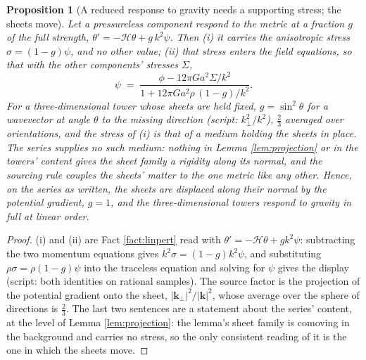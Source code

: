 \documentclass[11pt]{article}
\newtheorem{proposition}[theorem]{Proposition}
\theoremstyle{definition}
\begin{document}
\begin{proposition}[A reduced response to gravity needs a supporting stress; the sheets move]\label{prop:sheetsmove}
Let a pressureless component respond to the metric at a fraction $g$ of the full strength, $\theta' = -\mathcal{H}\theta + g\,k^{2}\psi$. Then (i) it carries the anisotropic stress $\sigma = (1 - g)\psi$, and no other value; (ii) that stress enters the field equations, so that with the other components' stresses $\Sigma$,
\[
\psi \;=\; \frac{\phi - 12\pi G a^{2}\Sigma/k^{2}}{1 + 12\pi G a^{2}\rho\,(1 - g)/k^{2}} .
\]
For a three-dimensional tower whose sheets are held fixed, $g = \sin^{2}\theta$ for a wavevector at angle $\theta$ to the missing direction (script: $k_{\perp}^{2}/k^{2}$), $\tfrac{2}{3}$ averaged over orientations, and the stress of (i) is that of a medium holding the sheets in place. The series supplies no such medium: nothing in Lemma \ref{lem:projection} or in the towers' content gives the sheet family a rigidity along its normal, and the sourcing rule couples the sheets' matter to the one metric like any other. Hence, on the series as written, the sheets are displaced along their normal by the potential gradient, $g = 1$, and the three-dimensional towers respond to gravity in full at linear order.
\end{proposition}

\begin{proof}
(i) and (ii) are Fact \ref{fact:linpert} read with $\theta' = -\mathcal{H}\theta + gk^{2}\psi$: subtracting the two momentum equations gives $k^{2}\sigma = (1 - g)k^{2}\psi$, and substituting $\rho\sigma = \rho(1 - g)\psi$ into the traceless equation and solving for $\psi$ gives the display (script: both identities on rational samples). The source factor is the projection of the potential gradient onto the sheet, $|\mathbf{k}_{\perp}|^{2}/|\mathbf{k}|^{2}$, whose average over the sphere of directions is $\tfrac{2}{3}$. The last two sentences are a statement about the series' content, at the level of Lemma \ref{lem:projection}: the lemma's sheet family is comoving in the background and carries no stress, so the only consistent reading of it is the one in which the sheets move.
\end{proof}
\end{document}
